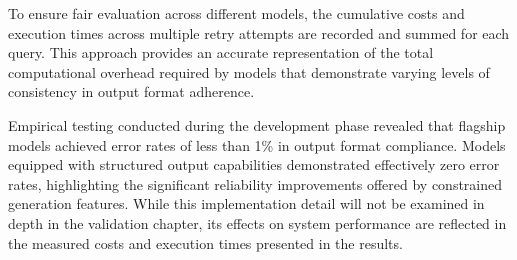 To ensure fair evaluation across different models, the cumulative costs and execution times across multiple retry attempts are recorded and summed for each query.
This approach provides an accurate representation of the total computational overhead required by models that demonstrate varying levels of consistency in output format adherence.

Empirical testing conducted during the development phase revealed that flagship models achieved error rates of less than 1\% in output format compliance.
Models equipped with structured output capabilities demonstrated effectively zero error rates, highlighting the significant reliability improvements offered by constrained generation features.
While this implementation detail will not be examined in depth in the validation chapter, its effects on system performance are reflected in the measured costs and execution times presented in the results.

